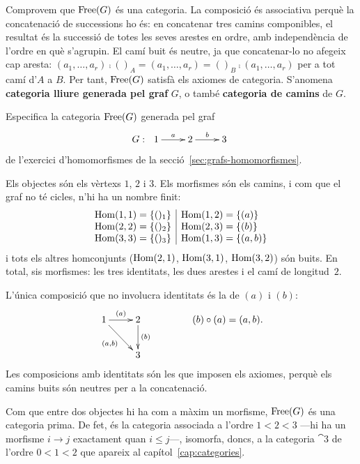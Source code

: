 Comprovem que $\operatorname{Free}(G)$ és una categoria. La composició és associativa perquè la concatenació de successions ho és: en concatenar tres camins componibles, el resultat és la successió de totes les seves arestes en ordre, amb independència de l'ordre en què s'agrupin. El camí buit és neutre, ja que concatenar-lo no afegeix cap aresta: $(a_1,\dots,a_r)\comp()_A=(a_1,\dots,a_r)=()_B\comp(a_1,\dots,a_r)$ per a tot camí d'$A$ a $B$. Per tant, $\operatorname{Free}(G)$ satisfà els axiomes de categoria. S'anomena \textbf{categoria lliure generada pel graf} $G$, o també \textbf{categoria de camins} de $G$.

\begin{exemple}\label{ex:grafs-free-cadena}
Especifica la categoria $\operatorname{Free}(G)$ generada pel graf
\[
G:\ 
\xymatrix{
    1 \ar[r]^-{a} & 2 \ar[r]^-{b}& 3
}
\]
de l'exercici d'homomorfismes de la secció~\ref{sec:grafs-homomorfismes}.
\end{exemple}
\begin{solucio}
Els objectes són els vèrtexs $1$, $2$ i $3$. Els morfismes són els camins, i com que el graf no té cicles, n'hi ha un nombre finit:
\[
\begin{array}{c|l}
\operatorname{Hom}(1,1)=\{()_1\} & \operatorname{Hom}(1,2)=\{(a)\} \\
\operatorname{Hom}(2,2)=\{()_2\} & \operatorname{Hom}(2,3)=\{(b)\} \\
\operatorname{Hom}(3,3)=\{()_3\} & \operatorname{Hom}(1,3)=\{(a,b)\}
\end{array}
\]
i tots els altres homconjunts ($\operatorname{Hom}(2,1)$, $\operatorname{Hom}(3,1)$, $\operatorname{Hom}(3,2)$) són buits. En total, sis morfismes: les tres identitats, les dues arestes i el camí de longitud~$2$.

L'única composició que no involucra identitats és la de $(a)$ i $(b)$:
\[
\xymatrix{
1 \ar[r]^-{(a)} \ar[dr]_-{(a,b)} & 2 \ar[d]^-{(b)} \\
& 3
}
\qquad\qquad
(b)\comp(a)=(a,b).
\]
Les composicions amb identitats són les que imposen els axiomes, perquè els camins buits són neutres per a la concatenació.

Com que entre dos objectes hi ha com a màxim un morfisme, $\operatorname{Free}(G)$ és una categoria prima. De fet, és la categoria associada a l'ordre $1<2<3$ ---hi ha un morfisme $i\to j$ exactament quan $i\leq j$---, isomorfa, doncs, a la categoria $\cat{3}$ de l'ordre $0<1<2$ que apareix al capítol~\ref{cap:categories}.
\end{solucio}

